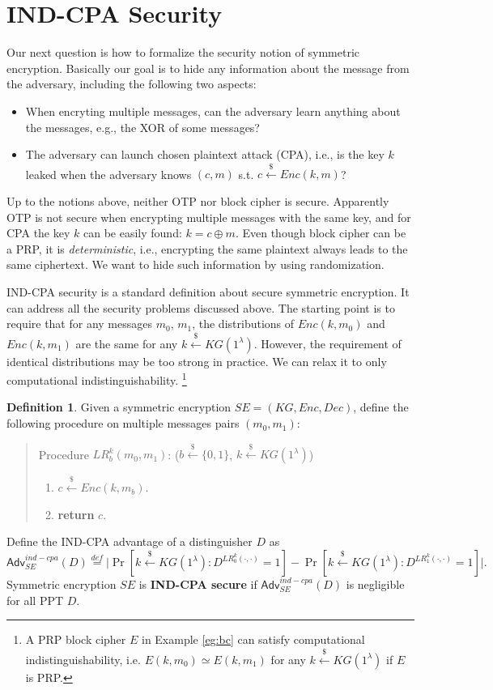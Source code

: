\documentclass[12pt]{article}
\newcommand{\eqdef}{\stackrel{def}{=}}
\newcommand{\bits}{\{0,1\}}
\newcommand{\getsr}{\stackrel{\$}{\gets}}
\newcommand{\Adv}{\mathsf{Adv}}
\theoremstyle{definition}
\newtheorem{definition}[theorem]{Definition}
\begin{document}
\section{IND-CPA Security}
Our next question is how to formalize the security notion of symmetric encryption. Basically our goal is to hide any information about the message from the adversary, including the following two aspects:
\begin{itemize}
\item When encryting multiple messages, can the adversary learn anything about the messages, e.g., the XOR of some messages?
\item The adversary can launch chosen plaintext attack (CPA), i.e., is the key $k$ leaked when the adversary knows $(c, m)$ s.t. $c \getsr Enc(k, m)$?
\end{itemize}
Up to the notions above, neither OTP nor block cipher is secure. 
Apparently OTP is not secure when encrypting multiple messages with the same key, and for CPA the key $k$ can be easily found: $k = c \oplus m$. 
Even though block cipher can be a PRP, it is \emph{deterministic}, i.e., encrypting the same plaintext always leads to the same ciphertext. We want to hide such information by using randomization.

IND-CPA security is a standard definition about secure symmetric encryption. It can address all the security problems discussed above.
The starting point is to require that for any messages $m_0$, $m_1$, the distributions of $Enc(k, m_0)$ and $Enc(k, m_1)$ are the same for any $k \getsr KG(1^\lambda)$. However, the requirement of identical distributions may be too strong in practice. We can relax it to only computational indistinguishability. \footnote{A PRP block cipher $E$ in Example \ref{eg:bc} can satisfy computational indistinguishability, i.e. $E(k, m_0) \simeq E(k, m_1)$ for any $k \getsr KG(1^\lambda)$ if $E$ is PRP.}

\begin{definition}
\label{def:ic}
Given a symmetric encryption $SE = (KG, Enc, Dec)$, define the following procedure on multiple messages pairs $(m_0, m_1)$:
\begin{quote}
Procedure $LR_b^k(m_0, m_1)$: ($b \getsr \bits$, $k \getsr KG(1^\lambda)$)
\begin{enumerate}
\item $c \getsr Enc(k, m_b)$.
\item {\bf return} $c$.
\end{enumerate}
\end{quote}

Define the IND-CPA advantage of a distinguisher $D$ as
$$\Adv_{SE}^{ind-cpa}(D) \eqdef \bigg| \Pr[k \getsr KG(1^\lambda) : D^{LR_0^k(\cdot, \cdot)}=1] - \Pr[k \getsr KG(1^\lambda) : D^{LR_1^k(\cdot, \cdot)}=1] \bigg|.$$
Symmetric encryption $SE$ is {\bf IND-CPA secure} if $\Adv_{SE}^{ind-cpa}(D)$ is negligible for all PPT $D$.
\end{definition}
\end{document}
